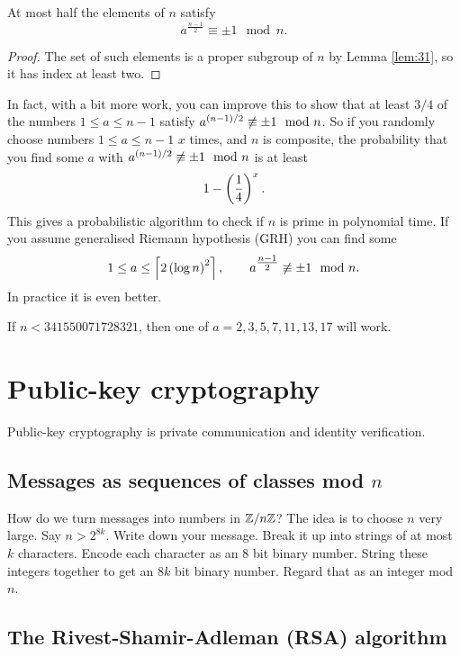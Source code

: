\begin{corollary}
At most half the elements of $ \unit{n} $ satisfy
$$ a^{\tfrac{n - 1}{2}} \equiv \pm 1 \mod n. $$
\end{corollary}

\begin{proof}
The set of such elements is a proper subgroup of $ \unit{n} $ by Lemma \ref{lem:31}, so it has index at least two.
\end{proof}

In fact, with a bit more work, you can improve this to show that at least $ 3 / 4 $ of the numbers $ 1 \le a \le n - 1 $ satisfy $ a^{\br{n - 1} / 2} \not\equiv \pm 1 \mod n $. So if you randomly choose numbers $ 1 \le a \le n - 1 $ $ x $ times, and $ n $ is composite, the probability that you find some $ a $ with $ a^{\br{n - 1} / 2} \not\equiv \pm 1 \mod n $ is at least
$$ 1 - \br{\dfrac{1}{4}}^x. $$
This gives a probabilistic algorithm to check if $ n $ is prime in polynomial time. If you assume generalised Riemann hypothesis (GRH) you can find some
$$ 1 \le a \le \left\lceil 2 \br{\log n}^2 \right\rceil, \qquad a^{\tfrac{n - 1}{2}} \not\equiv \pm 1 \mod n. $$
In practice it is even better.

\begin{example*}
If $ n < 341550071728321 $, then one of $ a = 2, 3, 5, 7, 11, 13, 17 $ will work.
\end{example*}

\pagebreak

\section{Public-key cryptography}

Public-key cryptography is private communication and identity verification.

\subsection{Messages as sequences of classes mod $ n $}

How do we turn messages into numbers in $ \mathbb{Z} / n\mathbb{Z} $? The idea is to choose $ n $ very large. Say $ n > 2^{8k} $. Write down your message. Break it up into strings of at most $ k $ characters. Encode each character as an $ 8 $ bit binary number. String these integers together to get an $ 8k $ bit binary number. Regard that as an integer mod $ n $.

\subsection{The Rivest-Shamir-Adleman (RSA) algorithm}

